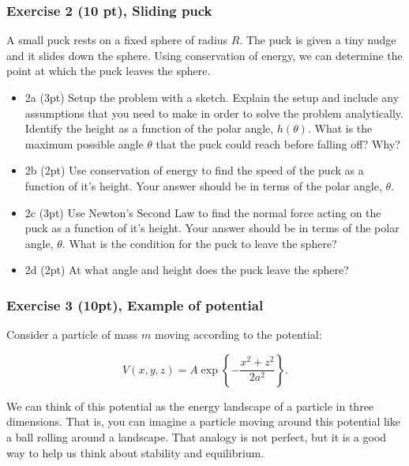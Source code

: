 \documentclass[11pt]{article}
\providecommand{\tightlist}{%
      \setlength{\itemsep}{0pt}\setlength{\parskip}{0pt}}
\begin{document}
    \subsubsection{Exercise 2 (10 pt), Sliding
puck}\label{exercise-2-10-pt-sliding-puck}

A small puck rests on a fixed sphere of radius \(R\). The puck is given
a tiny nudge and it slides down the sphere. Using conservation of
energy, we can determine the point at which the puck leaves the sphere.

\begin{itemize}
\tightlist
\item
  2a (3pt) Setup the problem with a sketch. Explain the setup and
  include any assumptions that you need to make in order to solve the
  problem analytically. Identify the height as a function of the polar
  angle, \(h(\theta)\). What is the maximum possible angle \(\theta\)
  that the puck could reach before falling off? Why?
\item
  2b (2pt) Use conservation of energy to find the speed of the puck as a
  function of it's height. Your answer should be in terms of the polar
  angle, \(\theta\).
\item
  2c (3pt) Use Newton's Second Law to find the normal force acting on
  the puck as a function of it's height. Your answer should be in terms
  of the polar angle, \(\theta\). What is the condition for the puck to
  leave the sphere?
\item
  2d (2pt) At what angle and height does the puck leave the sphere?
\end{itemize}

    \subsubsection{Exercise 3 (10pt), Example of
potential}\label{exercise-3-10pt-example-of-potential}

Consider a particle of mass \(m\) moving according to the potential:

\[
V(x,y,z)=A\exp\left\{-\frac{x^2+z^2}{2a^2}\right\}.
\]

We can think of this potential as the energy landscape of a particle in
three dimensions. That is, you can imagine a particle moving around this
potential like a ball rolling around a landscape. That analogy is not
perfect, but it is a good way to help us think about stability and
equilibrium.
\end{document}
